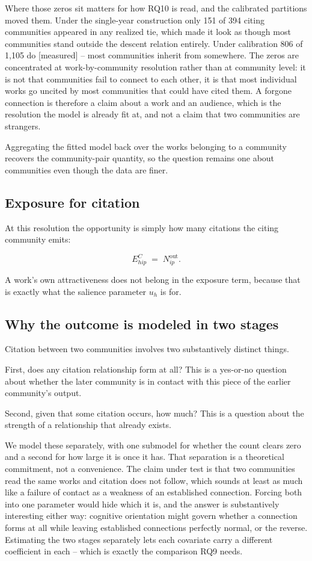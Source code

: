 \documentclass[11pt]{article}
\newcommand{\meas}{{\footnotesize\textsf{[measured]}}}
\begin{document}
Where those zeros sit matters for how RQ10 is read, and the calibrated partitions moved
them. Under the single-year construction only 151 of 394 citing communities appeared in any
realized tie, which made it look as though most communities stand outside the descent
relation entirely. Under calibration 806 of 1{,}105 do \meas{} -- most communities inherit
from somewhere. The zeros are concentrated at work-by-community resolution rather than at
community level: it is not that communities fail to connect to each other, it is that most
individual works go uncited by most communities that could have cited them. A forgone
connection is therefore a claim about a work and an audience, which is the resolution the
model is already fit at, and not a claim that two communities are strangers.

Aggregating the fitted model back over the works belonging to a community recovers the
community-pair quantity, so the question remains one about communities even though the
data are finer.

\subsection{Exposure for citation}

At this resolution the opportunity is simply how many citations the citing community emits:

\begin{equation}
E^{C}_{hip} \;=\; N^{\mathrm{out}}_{ip}.
\end{equation}

A work's own attractiveness does not belong in the exposure term, because that is exactly
what the salience parameter $u_h$ is for.

\subsection{Why the outcome is modeled in two stages}

Citation between two communities involves two substantively distinct things.

First, does any citation relationship form at all? This is a yes-or-no question about
whether the later community is in contact with this piece of the earlier community's output.

Second, given that some citation occurs, how much? This is a question about the strength of
a relationship that already exists.

We model these separately, with one submodel for whether the count clears zero and a second
for how large it is once it has. That separation is a theoretical commitment, not a
convenience. The claim under test is that two communities read the same works and citation
does not follow, which sounds at least as much like a failure of contact as a weakness of an
established connection. Forcing both into one parameter would hide which it is, and the
answer is substantively interesting either way: cognitive orientation might govern whether a
connection forms at all while leaving established connections perfectly normal, or the
reverse. Estimating the two stages separately lets each covariate carry a different
coefficient in each -- which is exactly the comparison RQ9 needs.
\end{document}
